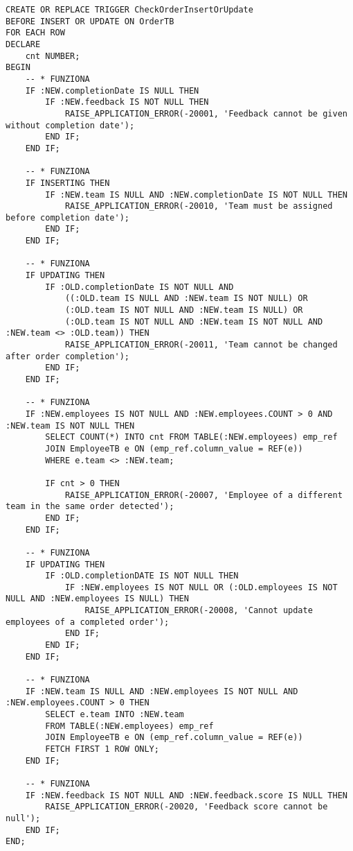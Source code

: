 \begin{lstlisting}
CREATE OR REPLACE TRIGGER CheckOrderInsertOrUpdate
BEFORE INSERT OR UPDATE ON OrderTB
FOR EACH ROW
DECLARE
    cnt NUMBER;
BEGIN
    -- * FUNZIONA 
    IF :NEW.completionDate IS NULL THEN
        IF :NEW.feedback IS NOT NULL THEN
            RAISE_APPLICATION_ERROR(-20001, 'Feedback cannot be given without completion date');
        END IF;
    END IF;

    -- * FUNZIONA
    IF INSERTING THEN
        IF :NEW.team IS NULL AND :NEW.completionDate IS NOT NULL THEN
            RAISE_APPLICATION_ERROR(-20010, 'Team must be assigned before completion date');
        END IF;
    END IF;

    -- * FUNZIONA
    IF UPDATING THEN
        IF :OLD.completionDate IS NOT NULL AND 
            ((:OLD.team IS NULL AND :NEW.team IS NOT NULL) OR
            (:OLD.team IS NOT NULL AND :NEW.team IS NULL) OR
            (:OLD.team IS NOT NULL AND :NEW.team IS NOT NULL AND :NEW.team <> :OLD.team)) THEN
            RAISE_APPLICATION_ERROR(-20011, 'Team cannot be changed after order completion');
        END IF;
    END IF;

    -- * FUNZIONA
    IF :NEW.employees IS NOT NULL AND :NEW.employees.COUNT > 0 AND :NEW.team IS NOT NULL THEN
        SELECT COUNT(*) INTO cnt FROM TABLE(:NEW.employees) emp_ref
        JOIN EmployeeTB e ON (emp_ref.column_value = REF(e))
        WHERE e.team <> :NEW.team;

        IF cnt > 0 THEN
            RAISE_APPLICATION_ERROR(-20007, 'Employee of a different team in the same order detected');
        END IF;
    END IF;

    -- * FUNZIONA
    IF UPDATING THEN
        IF :OLD.completionDATE IS NOT NULL THEN
            IF :NEW.employees IS NOT NULL OR (:OLD.employees IS NOT NULL AND :NEW.employees IS NULL) THEN
                RAISE_APPLICATION_ERROR(-20008, 'Cannot update employees of a completed order');
            END IF;
        END IF;
    END IF;

    -- * FUNZIONA
    IF :NEW.team IS NULL AND :NEW.employees IS NOT NULL AND :NEW.employees.COUNT > 0 THEN
        SELECT e.team INTO :NEW.team
        FROM TABLE(:NEW.employees) emp_ref
        JOIN EmployeeTB e ON (emp_ref.column_value = REF(e))
        FETCH FIRST 1 ROW ONLY;
    END IF;

    -- * FUNZIONA
    IF :NEW.feedback IS NOT NULL AND :NEW.feedback.score IS NULL THEN
        RAISE_APPLICATION_ERROR(-20020, 'Feedback score cannot be null');
    END IF;
END;
\end{lstlisting}

